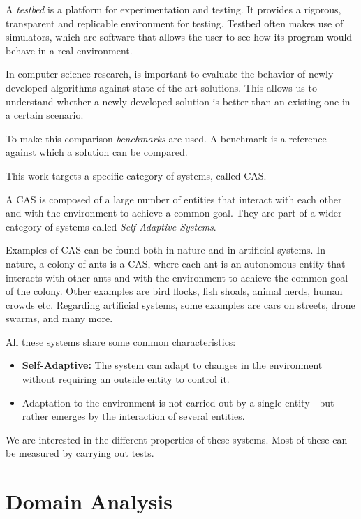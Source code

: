 \documentclass[12pt,a4paper,openright,twoside]{book}
\begin{document}
A \textit{testbed} is a platform for experimentation and testing. 
It provides a rigorous, transparent and replicable environment for testing.
Testbed often makes use of simulators, which are software that allows the user to see how its program would behave in a real environment.

In computer science research, is important to evaluate the behavior of newly developed algorithms against state-of-the-art solutions.
This allows us to understand whether a newly developed solution is better than an existing one in a certain scenario.

To make this comparison \textit{benchmarks} are used. A benchmark is a reference against which a solution can be compared.

This work targets a specific category of systems, called \ac{CAS}.

A \ac{CAS} is composed of a large number of entities that interact with each other and with the environment to achieve a common goal.
They are part of a wider category of systems called \textit{Self-Adaptive Systems}.

Examples of \ac{CAS} can be found both in nature and in artificial systems.
In nature, a colony of ants is a \ac{CAS}, where each ant is an autonomous entity that interacts with other ants and with the environment 
to achieve the common goal of the colony. 
Other examples are bird flocks, fish shoals, animal herds, human crowds etc.
Regarding artificial systems, some examples are cars on streets, drone swarms, and many more. \cite{2}

All these systems share some common characteristics:
\begin{itemize}
    \item \textbf{Self-Adaptive:} The system can adapt to changes in the environment without requiring an outside entity to control it.
    \item Adaptation to the environment is not carried out by a single entity - but rather emerges by the interaction of several entities. \cite{3}
\end{itemize}

We are interested in the different properties of these systems. Most of these can be measured by carrying out tests.

\chapter{Domain Analysis}
\end{document}
